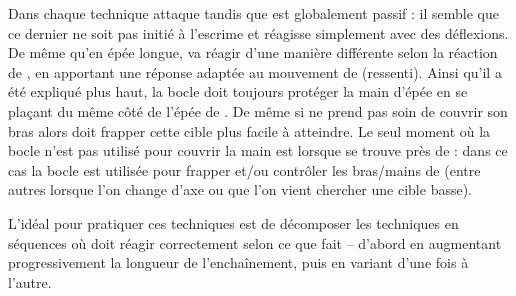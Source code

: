 Dans chaque technique \A attaque tandis que \D est globalement passif : il semble que ce dernier ne soit pas initié à l'escrime et réagisse simplement avec des déflexions.
De même qu'en épée longue, \A va réagir d'une manière différente selon la réaction de \D, en apportant une réponse adaptée au mouvement de \D (ressenti).
Ainsi qu'il a été expliqué plus haut, la bocle doit toujours protéger la main d'épée en se plaçant du même côté de l'épée de \D.
De même si \D ne prend pas soin de couvrir son bras alors \A doit frapper cette cible plus facile à atteindre.
Le seul moment où la bocle n'est pas utilisé pour couvrir la main est lorsque \A se trouve près de \D : dans ce cas la bocle est utilisée pour frapper et/ou contrôler les bras/mains de \D (entre autres lorsque l'on change d'axe ou que l'on vient chercher une cible basse).

L'idéal pour pratiquer ces techniques est de décomposer les techniques en séquences où \A doit réagir correctement selon ce que fait \D – d'abord en augmentant progressivement la longueur de l'enchaînement, puis en variant d'une fois à l'autre.


